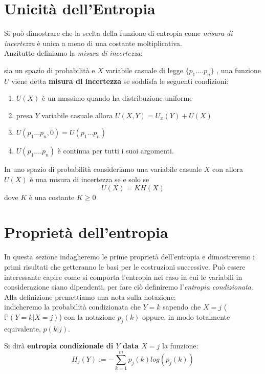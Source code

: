 \section{Unicità dell'Entropia}
\label{sec:UniEntropia}
Si può dimostrare che la scelta della funzione di entropia come \textit{misura di incertezza} è unica a meno di una costante moltiplicativa.\\
Anzitutto definiamo la \textit{misura di incertezza}:
\begin{defi}
sia \spacep un spazio di probabilità e $X$ variabile casuale di legge $\{ p_1....p_n \}$ , una funzione $U$ viene detta \textbf{misura di incertezza} se soddisfa le seguenti condizioni:
\begin{enumerate}
\item $U(X)$ è un massimo quando ha distribuzione uniforme
\item presa $Y$ variabile casuale allora $U(X,Y)=U_x(Y)+U(X)$
\item $U(p_1...p_n,0)=U(p_1...p_n)$
\item $U(p_1....p_n)$ è continua per tutti i suoi argomenti.
\end{enumerate}
\end{defi}

\begin{teo}
In uno spazio di probabilità \spacep consideriamo una variabile casuale $X$ con \lep allora\\
$U(X)$ è una misura di incertezza se e solo se 
$$U(X)= KH(X)$$
dove $K$ è una costante $K\geq 0$
\end{teo}


\section{Proprietà dell'entropia}
\label{sec:PropriEntropia}
In questa sezione indagheremo le prime proprietà dell'entropia e dimostreremo i primi risultati che getteranno le basi per le costruzioni successive.
Può essere interessante capire come si comporta l'entropia nel caso in cui le variabili in considerazione siano dipendenti, per fare ciò definiremo l'\textit{entropia condizionata}. Alla definizione premettiamo una nota sulla notazione:\\
indicheremo la probabilità condizionata che $Y=k$ sapendo che $X=j$ ($\mathbb{P}(Y=k|X=j)$) con la notazione $p_{j}(k)$ oppure, in modo totalmente equivalente, $p(k|j)$.
\begin{defi} \label{defi:condiz}
Si dirà \textbf{entropia condizionale di $Y$ data $X=j$} la funzione: 
\begin{equation}\label{eq:6.6}
H_j(Y):=-\sum_{k=1}^m p_j(k)log(p_j(k))
\end{equation}
\end{defi}

